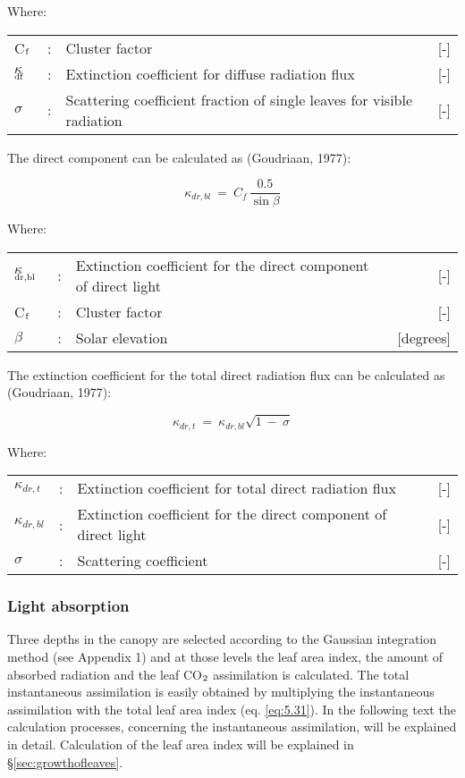 Where:\\[5pt]
\begin{tabularx}{\textwidth}{llXr}
	C$_{{\rm f}}$ &:& Cluster factor    &    [-]\\
	$\kappa$$_{{\rm df}}$ &:& Extinction coefficient for diffuse radiation flux   &     [-]\\
	$\sigma$ &:& Scattering coefficient fraction of single leaves for
	visible radiation  &      [-]\\
\end{tabularx}

The direct component can be calculated as (Goudriaan, 1977):

\begin{equation}
\label{eq:5.17}
\kappa _{dr,bl} ~=~{ C _{f} }\,{\frac{0.5}{\sin \beta }}
\end{equation}

Where:\\[5pt]
\begin{tabularx}{\textwidth}{llXr}
	$\kappa$$_{{\rm dr,bl}}$ &:& Extinction coefficient for the direct component of direct light   &     [-] \\
	C$_{{\rm f}}$ &:& Cluster factor     &   [-]\\
	$\beta$ &:& Solar elevation     &   [degrees]\\
\end{tabularx}

The extinction coefficient for the total direct radiation flux can be calculated as (Goudriaan, 1977):

\begin{equation}
\label{eq:5.18}
\kappa _{dr,t} ~=~ \kappa _{dr,bl} \sqrt{1~-~\sigma }
\end{equation}

Where:\\[5pt]
\begin{tabularx}{\textwidth}{llXr}
	$\kappa_{dr,t}$ &:& Extinction coefficient for total direct radiation flux   &    [-]\\
	$\kappa_{dr,bl}$ &:& Extinction coefficient for the direct component of direct light  &   [-]\\
	$\sigma$ &:& Scattering coefficient     &    [-]\\
\end{tabularx}

\subsubsection{Light absorption}
Three depths in the canopy are selected according to the Gaussian integration method (see
Appendix 1) and at those levels the leaf area index, the amount of absorbed radiation and
the leaf CO$_{{\rm 2}}$ assimilation is calculated. The total instantaneous assimilation is easily
obtained by multiplying the instantaneous assimilation with the total leaf area index (eq.
\ref{eq:5.31}). In the following text the calculation processes, concerning the instantaneous
assimilation, will be explained in detail. Calculation of the leaf area index will be
explained in \S \ref{sec:growthofleaves}.

